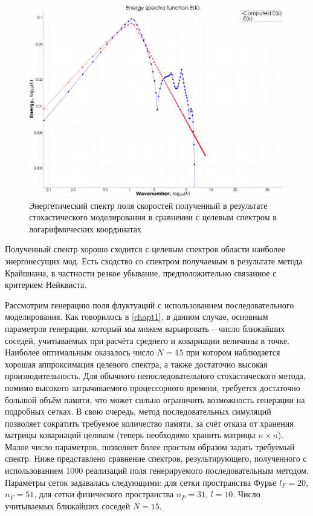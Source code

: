 \begin{figure}[ht] 
  \center
  \includegraphics [width=0.9\linewidth] {images/kriging/3components/energy_function_kriging_loglog.png}
  \caption{Энергетический спектр поля скоростей полученный в результате стохастического моделирования в сравнении с целевым спектром в логарифмических координатах} 
  \label{img:kriging_spectra_function_compare}  
\end{figure}

Полученный спектр хорошо сходится с целевым спектров области наиболее энергонесущих мод. Есть сходство со спектром получаемым в результате метода Крайшнана, в частности резкое убывание, предположительно связанное с критерием Нейквиста.

Рассмотрим генерацию поля флуктуаций с использованием последовательного моделирования. Как говорилось в \ref{chapt1}, в данном случае, основным параметров генерации, который мы можем варьировать -- число ближайших соседей, учитываемых при расчёта среднего и ковариации величины в точке. Наиболее оптимальным оказалось число $N=15$ при котором наблюдается хорошая аппроксимация целевого спектра, а также достаточно высокая производительность. Для обычного непоследовательного стохастического метода, помимо высокого затрачиваемого процессорного времени, требуется достаточно большой объём памяти, что может сильно ограничить возможность генерации на подробных сетках. В свою очередь, метод последовательных симуляций позволяет сократить требуемое количество памяти, за счёт отказа от хранения матрицы ковариаций целиком (теперь необходимо хранить матрицы $n \times n$). Малое число параметров, позволяет более простым образом задать требуемый спектр. Ниже представлено сравнение спектров, результирующего, полученного с использованием 1000 реализаций поля генерируемого последовательным методом. Параметры сеток задавалась следующими: для сетки пространства Фурье $l_F=20$, $n_F = 51$, для сетки физического пространства $n_{P} = 31$, $l=10$. Число учитываемых ближайших соседей $N = 15$.

